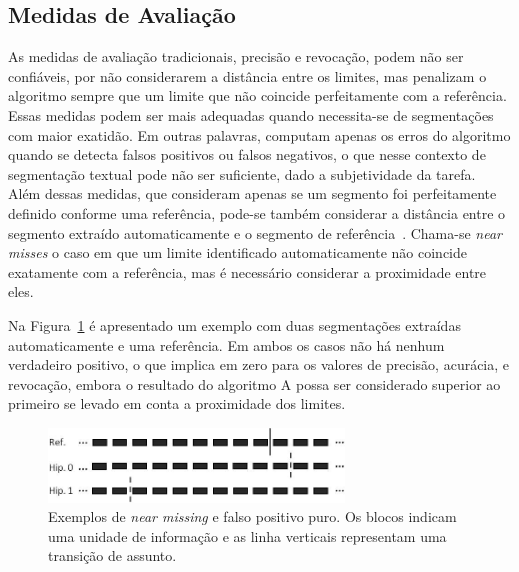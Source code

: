\subsection{Medidas de Avaliação}





As medidas de avaliação tradicionais, precisão e revocação, podem não ser confiáveis, por não considerarem a distância entre os limites, mas penalizam o algoritmo sempre que um limite que não coincide perfeitamente com a referência. Essas medidas podem ser mais adequadas quando necessita-se de segmentações com maior exatidão. Em outras palavras, computam apenas os erros do algoritmo quando se detecta falsos positivos ou falsos negativos, o que nesse contexto de segmentação textual pode não ser suficiente, dado a subjetividade da tarefa. Além dessas medidas, que consideram apenas se um segmento foi perfeitamente definido conforme uma referência, pode-se também considerar a distância entre o segmento extraído automaticamente e o segmento de referência~\cite{Kern2009}. Chama-se \textit{near misses} o caso em que um limite identificado automaticamente não coincide exatamente com a referência, mas é necessário considerar a proximidade entre eles.

Na Figura~\ref{fig:exemplosegmentacaozoom} é apresentado um exemplo com duas segmentações extraídas automaticamente e uma referência. Em ambos os casos não há nenhum verdadeiro positivo, o que implica em zero para os valores de precisão, acurácia, e revocação, embora o resultado do algoritmo A possa ser considerado superior ao primeiro se levado em conta a proximidade dos limites.

  \begin{figure}[!h]

	\centering
	\includegraphics[width=0.7\textwidth]{conteudo/capitulos/figs/windiffzoom.jpg}
	\caption{Exemplos de \textit{near missing} e falso positivo puro. Os blocos indicam uma unidade de informação e as linha verticais representam uma transição de assunto. }
	\label{fig:exemplosegmentacaozoom}

  \end{figure}
  

